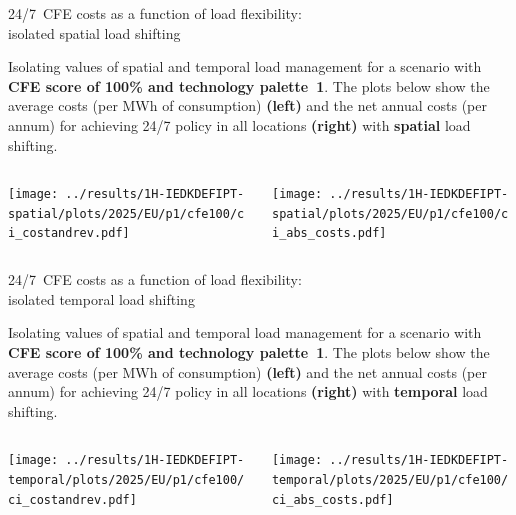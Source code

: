 \begin{frame}{24/7~CFE costs as a function of load flexibility:\\
  isolated spatial load shifting}
  \label{isolated_spatial_cfe100_p1}

  {\footnotesize
  
  Isolating values of spatial and temporal load management for a scenario with {\bf CFE score of 100\% and technology palette~1}. 
  The plots below show the average costs (per MWh of consumption) {\bf (left)} and the net annual costs (per annum) for achieving 24/7 policy in all locations {\bf (right)} with {\bf spatial} load shifting.

  \begin{columns}[T]
  \begin{column}{8cm}
  \centering
  \texttt{[image: ../results/1H-IEDKDEFIPT-spatial/plots/2025/EU/p1/cfe100/ci\_costandrev.pdf]}
  \end{column}

  \begin{column}{7cm}
    \texttt{[image: ../results/1H-IEDKDEFIPT-spatial/plots/2025/EU/p1/cfe100/ci\_abs\_costs.pdf]}
  \end{column}
  \end{columns}
  }
\end{frame}


\begin{frame}{24/7~CFE costs as a function of load flexibility:\\
  isolated temporal load shifting}
  \label{isolated_temporal_cfe100_p1}

  {\footnotesize
  
  Isolating values of spatial and temporal load management for a scenario with {\bf CFE score of 100\% and technology palette~1}. 
  The plots below show the average costs (per MWh of consumption) {\bf (left)} and the net annual costs (per annum) for achieving 24/7 policy in all locations {\bf (right)} with {\bf temporal} load shifting.

  \begin{columns}[T]
  \begin{column}{8cm}
  \centering
  \texttt{[image: ../results/1H-IEDKDEFIPT-temporal/plots/2025/EU/p1/cfe100/ci\_costandrev.pdf]}
  \end{column}

  \begin{column}{7cm}
    \texttt{[image: ../results/1H-IEDKDEFIPT-temporal/plots/2025/EU/p1/cfe100/ci\_abs\_costs.pdf]}
  \end{column}
  \end{columns}
  }
\end{frame}


